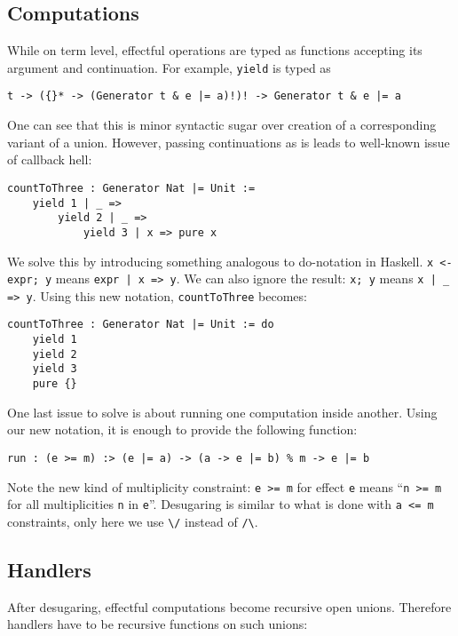 \documentclass[a4paper,14pt]{extreport}
\begin{document}
\subsection{Computations}

While on term level, effectful operations are typed as functions accepting its
argument and continuation. For example, \verb|yield| is typed as

\begin{verbatim}
t -> ({}* -> (Generator t & e |= a)!)! -> Generator t & e |= a
\end{verbatim}

One can see that this is minor syntactic sugar over creation of a corresponding
variant of a union. However, passing continuations as is leads to well-known
issue of callback hell:

\begin{verbatim}
countToThree : Generator Nat |= Unit :=
    yield 1 | _ =>
        yield 2 | _ =>
            yield 3 | x => pure x
\end{verbatim}

We solve this by introducing something analogous to do-notation in Haskell.
\verb|x <- expr; y| means \verb+expr | x => y+. We can also ignore the result:
\verb|x; y| means \verb+x | _ => y+. Using this new notation,
\verb|countToThree| becomes:

\begin{verbatim}
countToThree : Generator Nat |= Unit := do
    yield 1
    yield 2
    yield 3
    pure {}
\end{verbatim}

One last issue to solve is about running one computation inside another. Using
our new notation, it is enough to provide the following function:

\begin{verbatim}
run : (e >= m) :> (e |= a) -> (a -> e |= b) % m -> e |= b
\end{verbatim}

Note the new kind of multiplicity constraint: \verb|e >= m| for effect \verb|e|
means ``\verb|n >= m| for all multiplicities \verb|n| in \verb|e|''. Desugaring
is similar to what is done with \verb|a <= m| constraints, only here we use
\verb|\/| instead of \verb|/\|.

\subsection{Handlers}

After desugaring, effectful computations become recursive open unions. Therefore
handlers have to be recursive functions on such unions:
\end{document}
